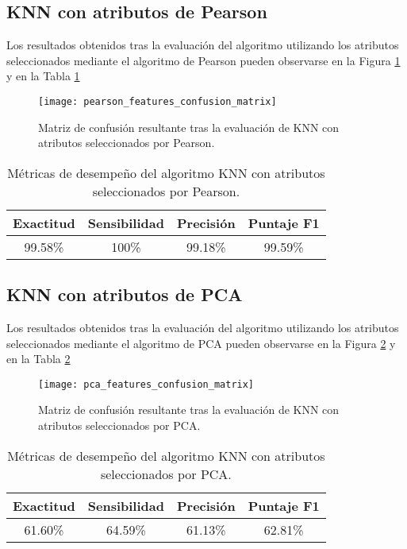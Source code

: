 \FloatBarrier
\newpage
\subsection{KNN con atributos de Pearson}
Los resultados obtenidos tras la evaluación del algoritmo utilizando los atributos seleccionados mediante el algoritmo de Pearson pueden observarse en la Figura \ref{Fig: PearsonCM} y en la Tabla \ref{Tab: ResPearson}

\begin{figure}[htbp]
	\centering
	\texttt{[image: pearson\_features\_confusion\_matrix]}
	\caption{Matriz de confusión resultante tras la evaluación de KNN con atributos seleccionados por Pearson.}
	\label{Fig: PearsonCM}
\end{figure}

\begin{table}[htbp]
	\centering
	\caption{Métricas de desempeño del algoritmo KNN con atributos seleccionados por Pearson.}
	\begin{tabular}{cccc}
		\hline\hline
		Exactitud    & Sensibilidad   & Precisión & Puntaje F1    \\ 
		\hline\hline
		99.58\% & 100\% & 99.18\% & 99.59\% \\
		\hline\hline
	\end{tabular}
	\label{Tab: ResPearson}
\end{table}

\newpage
\subsection{KNN con atributos de PCA}
Los resultados obtenidos tras la evaluación del algoritmo utilizando los atributos seleccionados mediante el algoritmo de PCA pueden observarse en la Figura \ref{Fig: PCACM} y en la Tabla \ref{Tab: ResPCA}

\begin{figure}[htbp]
	\centering
	\texttt{[image: pca\_features\_confusion\_matrix]}
	\caption{Matriz de confusión resultante tras la evaluación de KNN con atributos seleccionados por PCA.}
	\label{Fig: PCACM}
\end{figure}

\begin{table}[htbp]
	\centering
	\caption{Métricas de desempeño del algoritmo KNN con atributos seleccionados por PCA.}
	\begin{tabular}{cccc}
		\hline\hline
		Exactitud    & Sensibilidad   & Precisión & Puntaje F1    \\ 
		\hline\hline
		61.60\% & 64.59\% & 61.13\% & 62.81\% \\
		\hline\hline
	\end{tabular}
	\label{Tab: ResPCA}
\end{table}

